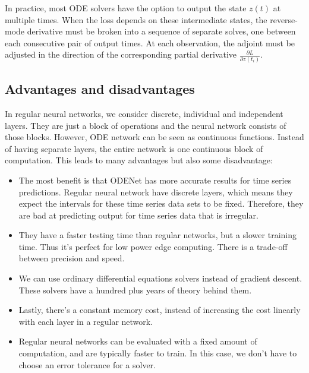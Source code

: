 \documentclass[10pt,a4paper]{article}
\theoremstyle{definition}
\theoremstyle{definition}
\begin{document}
In practice, most ODE solvers have the option to output the state $z(t)$ at multiple times. When the loss depends on these intermediate states, the reverse-mode derivative must be broken into a sequence of separate solves, one between each consecutive pair of output times. At each observation, the adjoint must be adjusted in the direction of the corresponding partial derivative $\frac{\partial L}{\partial z(t_i)}$.


 


\subsection{Advantages and disadvantages}

In regular neural networks, we consider discrete, individual and independent layers. They are just a block of operations and the neural network consists of those blocks. However, ODE network can be seen as continuous functions. Instead of having separate layers, the entire network is one continuous block of computation. This leads to many advantages but also some disadvantage:
\begin{itemize}
\item The most benefit is that ODENet has more accurate results for time series predictions. Regular neural network have discrete layers, which means they expect the intervals for these time series data sets to be fixed. Therefore, they are bad at predicting output for time series data that is irregular.
\item They have a faster testing time than regular networks, but a slower training time. Thus it's perfect for low power edge computing. There is a trade-off between precision and speed.
\item We can use ordinary differential equations solvers instead of gradient descent. These solvers have a hundred plus years of theory behind them.
\item Lastly, there's a constant memory cost, instead of increasing the cost linearly with each layer in a regular network.
\item Regular neural networks can be evaluated with a fixed amount of computation, and are typically faster to train. In this case, we don't have to choose an error tolerance for a solver.
\end{itemize}
\end{document}
